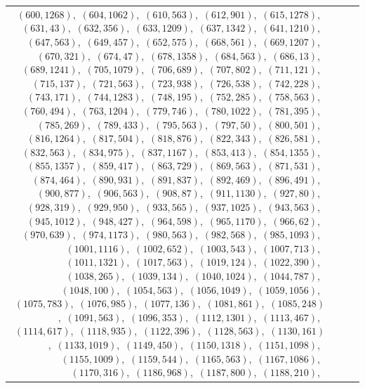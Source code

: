 \documentclass[11pt]{article}
\begin{document}
\begin{longtable}{@{}rrl>{\raggedright\arraybackslash}p{}@{}}
$(600,1268)$,\allowbreak\ $(604,1062)$,\allowbreak\ $(610,563)$,\allowbreak\ $(612,901)$,\allowbreak\ $(615,1278)$,\allowbreak\ $(631,43)$,\allowbreak\ $(632,356)$,\allowbreak\ $(633,1209)$,\allowbreak\ $(637,1342)$,\allowbreak\ $(641,1210)$,\allowbreak\ $(647,563)$,\allowbreak\ $(649,457)$,\allowbreak\ $(652,575)$,\allowbreak\ $(668,561)$,\allowbreak\ $(669,1207)$,\allowbreak\ $(670,321)$,\allowbreak\ $(674,47)$,\allowbreak\ $(678,1358)$,\allowbreak\ $(684,563)$,\allowbreak\ $(686,13)$,\allowbreak\ $(689,1241)$,\allowbreak\ $(705,1079)$,\allowbreak\ $(706,689)$,\allowbreak\ $(707,802)$,\allowbreak\ $(711,121)$,\allowbreak\ $(715,137)$,\allowbreak\ $(721,563)$,\allowbreak\ $(723,938)$,\allowbreak\ $(726,538)$,\allowbreak\ $(742,228)$,\allowbreak\ $(743,171)$,\allowbreak\ $(744,1283)$,\allowbreak\ $(748,195)$,\allowbreak\ $(752,285)$,\allowbreak\ $(758,563)$,\allowbreak\ $(760,494)$,\allowbreak\ $(763,1204)$,\allowbreak\ $(779,746)$,\allowbreak\ $(780,1022)$,\allowbreak\ $(781,395)$,\allowbreak\ $(785,269)$,\allowbreak\ $(789,433)$,\allowbreak\ $(795,563)$,\allowbreak\ $(797,50)$,\allowbreak\ $(800,501)$,\allowbreak\ $(816,1264)$,\allowbreak\ $(817,504)$,\allowbreak\ $(818,876)$,\allowbreak\ $(822,343)$,\allowbreak\ $(826,581)$,\allowbreak\ $(832,563)$,\allowbreak\ $(834,975)$,\allowbreak\ $(837,1167)$,\allowbreak\ $(853,413)$,\allowbreak\ $(854,1355)$,\allowbreak\ $(855,1357)$,\allowbreak\ $(859,417)$,\allowbreak\ $(863,729)$,\allowbreak\ $(869,563)$,\allowbreak\ $(871,531)$,\allowbreak\ $(874,464)$,\allowbreak\ $(890,931)$,\allowbreak\ $(891,837)$,\allowbreak\ $(892,469)$,\allowbreak\ $(896,491)$,\allowbreak\ $(900,877)$,\allowbreak\ $(906,563)$,\allowbreak\ $(908,87)$,\allowbreak\ $(911,1130)$,\allowbreak\ $(927,80)$,\allowbreak\ $(928,319)$,\allowbreak\ $(929,950)$,\allowbreak\ $(933,565)$,\allowbreak\ $(937,1025)$,\allowbreak\ $(943,563)$,\allowbreak\ $(945,1012)$,\allowbreak\ $(948,427)$,\allowbreak\ $(964,598)$,\allowbreak\ $(965,1170)$,\allowbreak\ $(966,62)$,\allowbreak\ $(970,639)$,\allowbreak\ $(974,1173)$,\allowbreak\ $(980,563)$,\allowbreak\ $(982,568)$,\allowbreak\ $(985,1093)$,\allowbreak\ $(1001,1116)$,\allowbreak\ $(1002,652)$,\allowbreak\ $(1003,543)$,\allowbreak\ $(1007,713)$,\allowbreak\ $(1011,1321)$,\allowbreak\ $(1017,563)$,\allowbreak\ $(1019,124)$,\allowbreak\ $(1022,390)$,\allowbreak\ $(1038,265)$,\allowbreak\ $(1039,134)$,\allowbreak\ $(1040,1024)$,\allowbreak\ $(1044,787)$,\allowbreak\ $(1048,100)$,\allowbreak\ $(1054,563)$,\allowbreak\ $(1056,1049)$,\allowbreak\ $(1059,1056)$,\allowbreak\ $(1075,783)$,\allowbreak\ $(1076,985)$,\allowbreak\ $(1077,136)$,\allowbreak\ $(1081,861)$,\allowbreak\ $(1085,248)$,\allowbreak\ $(1091,563)$,\allowbreak\ $(1096,353)$,\allowbreak\ $(1112,1301)$,\allowbreak\ $(1113,467)$,\allowbreak\ $(1114,617)$,\allowbreak\ $(1118,935)$,\allowbreak\ $(1122,396)$,\allowbreak\ $(1128,563)$,\allowbreak\ $(1130,161)$,\allowbreak\ $(1133,1019)$,\allowbreak\ $(1149,450)$,\allowbreak\ $(1150,1318)$,\allowbreak\ $(1151,1098)$,\allowbreak\ $(1155,1009)$,\allowbreak\ $(1159,544)$,\allowbreak\ $(1165,563)$,\allowbreak\ $(1167,1086)$,\allowbreak\ $(1170,316)$,\allowbreak\ $(1186,968)$,\allowbreak\ $(1187,800)$,\allowbreak\ $(1188,210)$,\allowbreak\ 
\end{longtable}
\end{document}
